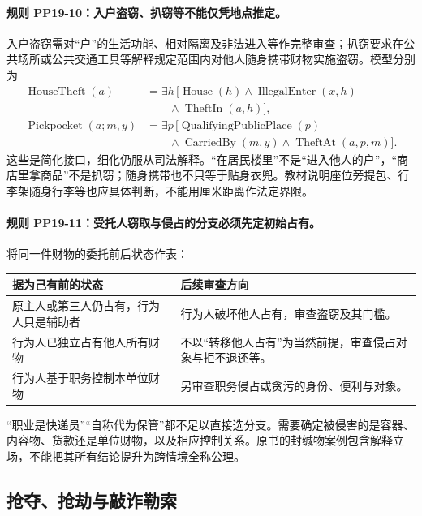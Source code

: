 \paragraph{规则 PP19-10：入户盗窃、扒窃等不能仅凭地点推定。}
\mbox{}\par
入户盗窃需对“户”的生活功能、相对隔离及非法进入等作完整审查；扒窃要求在公共场所或公共交通工具等解释规定范围内对他人随身携带财物实施盗窃。模型分别为
\[
\begin{aligned}
\operatorname{HouseTheft}(a)&=\exists h\,[\operatorname{House}(h)
\land\operatorname{IllegalEnter}(x,h)\\
&\qquad\land\operatorname{TheftIn}(a,h)],\\
\operatorname{Pickpocket}(a;m,y)&=\exists p\,[\operatorname{QualifyingPublicPlace}(p)\\
&\qquad\land\operatorname{CarriedBy}(m,y)
\land\operatorname{TheftAt}(a,p,m)].
\end{aligned}
\]
这些是简化接口，细化仍服从司法解释。“在居民楼里”不是“进入他人的户”，“商店里拿商品”不是扒窃；随身携带也不只等于贴身衣兜。教材说明座位旁提包、行李架随身行李等也应具体判断，不能用厘米距离作法定界限。

\paragraph{规则 PP19-11：受托人窃取与侵占的分支必须先定初始占有。}
\mbox{}\par
将同一件财物的委托前后状态作表：
\begin{center}
\begin{tabular}{p{.37\linewidth}p{.43\linewidth}}
\hline
据为己有前的状态 & 后续审查方向\\ \hline
原主人或第三人仍占有，行为人只是辅助者 & 行为人破坏他人占有，审查盗窃及其门槛。\\
行为人已独立占有他人所有财物 & 不以“转移他人占有”为当然前提，审查侵占对象与拒不退还等。\\
行为人基于职务控制本单位财物 & 另审查职务侵占或贪污的身份、便利与对象。\\ \hline
\end{tabular}
\end{center}
“职业是快递员”“自称代为保管”都不足以直接选分支。需要确定被侵害的是容器、内容物、货款还是单位财物，以及相应控制关系。原书的封缄物案例包含解释立场，不能把其所有结论提升为跨情境全称公理。

\subsection{抢夺、抢劫与敲诈勒索}
